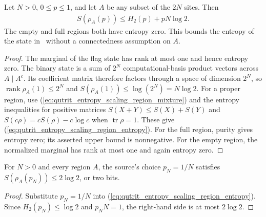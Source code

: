 \begin{lemma}
    \label{thm:qutrit_entropy_scaling_region_entropy}
    \leanok
    Let $N>0$, $0\le p\le1$, and let $A$ be any subset of the $2N$ sites. Then
    \begin{align}
        S(\rho_A(p))\le H_2(p)+pN\log2.
        \label{eq:qutrit_entropy_scaling_region_entropy}
    \end{align}
    The empty and full regions both have entropy zero.
    This bounds the entropy of the state in~\cite{Schuch2008EntropyScaling}
    without a connectedness assumption on $A$.
\end{lemma}
\begin{proof}\leanok
    The marginal of the flag state has rank at most one and hence entropy
    zero. The binary state is a sum of $2^N$ computational-basis product
    vectors across $A\mid A^c$. Its coefficient matrix therefore factors
    through a space of dimension $2^N$, so
    $\operatorname{rank}\rho_A(1)\le2^N$ and
    $S(\rho_A(1))\le\log(2^N)=N\log2$.
    For a proper region, use (\ref{eq:qutrit_entropy_scaling_region_mixture})
    and the entropy inequalities for positive matrices
    $S(X+Y)\le S(X)+S(Y)$ and
    $S(c\rho)=cS(\rho)-c\log c$ when $\operatorname{tr}\rho=1$.
    These give (\ref{eq:qutrit_entropy_scaling_region_entropy}).
    For the full region, purity gives entropy zero; its asserted upper bound
    is nonnegative. For the empty region, the normalized marginal has rank
    at most one and again entropy zero.
\end{proof}

\begin{lemma}
    \label{thm:qutrit_entropy_scaling_family_entropy}
    \leanok
    For $N>0$ and every region $A$, the source's choice $p_N=1/N$ satisfies
    $S(\rho_A(p_N))\le2\log2$, or two bits.
\end{lemma}
\begin{proof}\leanok
    Substitute $p_N=1/N$ into
    (\ref{eq:qutrit_entropy_scaling_region_entropy}). Since
    $H_2(p_N)\le\log2$ and $p_N N=1$, the right-hand side is at most
    $2\log2$.
\end{proof}
